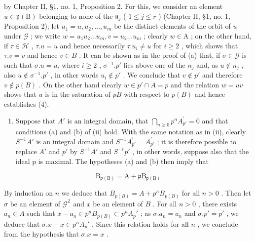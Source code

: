 by Chapter II, §1, no. 1, Proposition 2. For this, we consider an element \(u \in \mathfrak{p}(\mathrm{B})\) belonging to none of the \(\mathfrak{n}_j\) ( \(1 \leqslant j \leqslant r\) ) (Chapter II, §1, no. 1, Proposition 2); let \(u_1 = u, u_2, \ldots, u_m\) be the distinct elements of the orbit of \(u\) under \(\mathcal{G}\) ; we write \(w = u_1u_2\ldots u_m, v = u_2\ldots u_m\) ; clearly \(w \in \mathrm{A}\) ; on the other hand, if \(\tau \in \mathcal{H}\) , \(\tau .u = u\) and hence necessarily \(\tau .u_{i} \neq u\) for \(i \geqslant 2\) , which shows that \(\tau .v = v\) and hence \(v \in B\) . It can be shown as in the proof of (a) that, if \(\sigma \in \mathcal{G}\) is such that \(\sigma .u = u_{i}\) where \(i \geqslant 2\) , \(\sigma^{-1}.p'\) lies above one of the \(n_{j}\) and, as \(u \notin n_{j}\) , also \(u \notin \sigma^{-1}.p'\) , in other words \(u_{i} \notin p'\) . We conclude that \(v \notin p'\) and therefore \(v \notin p(B)\) . On the other hand clearly \(w \in p' \cap A = p\) and the relation \(w = uv\) shows that \(u\) is in the saturation of \(pB\) with respect to \(p(B)\) and hence establishes (4).

\begin{enumerate}
\def\labelenumi{(\roman{enumi})}
\setcounter{enumi}{2}
\tightlist
\item
  Suppose that \(A'\) is an integral domain, that \(\bigcap_{n\geq0}p^{n}A_{p'}^{\prime}=0\) and that conditions (a) and (b) of (ii) hold. With the same notation as in (ii), clearly \(S^{-1}A'\) is an integral domain and \(S^{-1}A_{p'}^{\prime}=A_{p'}^{\prime}\) ; it is therefore possible to replace \(A'\) and \(p'\) by \(S^{-1}A'\) and \(S^{-1}p'\) , in other words, suppose also that the ideal p is maximal. The hypotheses (a) and (b) then imply that
\end{enumerate}

\[
\mathrm{B} _ {\mathfrak {p} (\mathrm{B})} = \mathrm{A} + \mathfrak {p} \mathrm{B} _ {\mathfrak {p} (\mathrm{B})}\tag{5}
\]

By induction on \(n\) we deduce that \(B_{p(B)} = A + p^n B_{p(B)}\) for all \(n > 0\) . Then let \(\sigma\) be an element of \(\mathcal{G}^{\mathbb{Z}}\) and \(x\) be an element of \(B\) . For all \(n > 0\) , there exists \(a_n \in A\) such that \(x - a_n \in p^n B_{p(B)} \subset p^n A_p'\) ; as \(\sigma .a_n = a_n\) and \(\sigma .p' = p'\) , we deduce that \(\sigma .x - x \in p^n A_p'\) . Since this relation holds for all \(n\) , we conclude from the hypothesis that \(\sigma .x = x\) .

